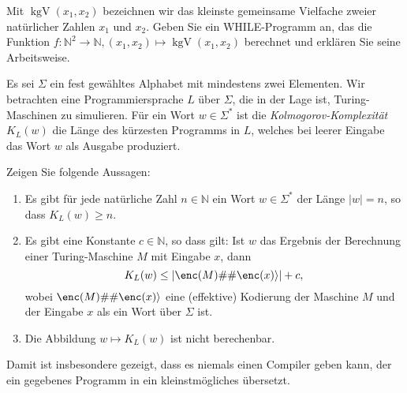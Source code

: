 \documentclass[german]{latteachCD}[2017/03/28]
\begin{document}
\begin{exercise}
  Mit $\operatorname{kgV}(x_{1}, x_{2})$ bezeichnen wir das kleinste gemeinsame Vielfache zweier
  natürlicher Zahlen $x_{1}$ und $x_{2}$.
  Geben Sie ein WHILE-Programm an, das die Funktion $f \colon \mathbb N^{2} \to
  \mathbb N, (x_{1}, x_{2}) \mapsto \operatorname{kgV}(x_{1}, x_{2})$
  berechnet und erklären Sie seine Arbeitsweise.
\end{exercise}

\begin{exercise}
  Es sei $\Sigma$ ein fest gewähltes Alphabet mit mindestens zwei Elementen.
  Wir betrachten eine Programmiersprache $L$ über $\Sigma$, die in der Lage ist,
  Turing-Maschinen zu simulieren.  Für ein Wort $w \in \Sigma^{*}$ ist die
  \emph{Kolmogorov-Komplexität} $K_{L}(w)$ die Länge des kürzesten Programms in
  $L$, welches bei leerer Eingabe das Wort $w$ als Ausgabe produziert.

  Zeigen Sie folgende Aussagen:
  \begin{enumerate}
  \item Es gibt für jede natürliche Zahl $n \in \mathbb N$ ein Wort $w \in
    \Sigma^{*}$ der Länge $\lvert w\rvert = n$, so dass $K_{L}(w) \geq n$.
  \item Es gibt eine Konstante $c \in \mathbb N$, so dass gilt: Ist $w$ das
    Ergebnis der Berechnung einer Turing-Maschine $M$ mit Eingabe $x$, dann
    \begin{equation*}
      K_{L}(w) \leq \lvert\enc(M)\#\#\enc(x)\rangle\rvert + c,
    \end{equation*}
    wobei $\enc(M)\#\#\enc(x)\rangle$ eine (effektive) Kodierung der Maschine
    $M$ und der Eingabe $x$ als ein Wort über $\Sigma$ ist.
  \item Die Abbildung $w \mapsto K_{L}(w)$ ist nicht berechenbar.
  \end{enumerate}

  Damit ist insbesondere gezeigt, dass es niemals einen Compiler geben kann, der
  ein gegebenes Programm in ein kleinstmögliches übersetzt.
\end{exercise}
\end{document}
